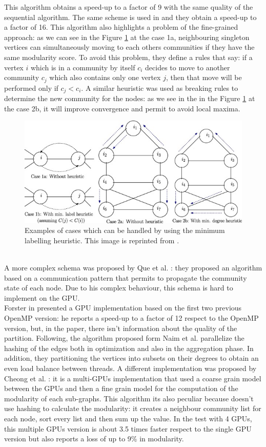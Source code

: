 This algorithm obtains a speed-up to a factor of 9 with the same quality of the sequential algorithm. The same scheme is used in \cite{lu2015parallel} and they obtain a speed-up to a factor of 16.
This algorithm also highlights a problem of the fine-grained approach: as we can see in the Figure \ref{fig:swap} at the case 1a, neighbouring singleton vertices can simultaneously moving to each others communities if they have the same modularity score. To avoid this problem, they define a rules that say: if a vertex $i$ which is in a community by itself $c_i$ decides to move to another community $c_j$  which also contains only one vertex $j$, then that move will be performed only if $c_j < c_i$. A similar heuristic was used as breaking rules to determine the new community for the nodes: as we see in the in the Figure \ref{fig:swap} at the case 2b, it will improve convergence and permit to avoid local maxima.
\begin{figure}
	\centering
	\includegraphics[width=1\linewidth]{0-resources/swap.jpg}
	\caption{ Examples of cases which can be handled by using the minimum labelling heuristic. This image is reprinted from \cite{lu2015parallel}.}
	\label{fig:swap}
\end{figure}\\
A more complex schema was proposed by Que et al. \cite{que2015scalable}: they proposed an algorithm based on a communication pattern that permits to propagate the community state of each node. 
Due to his complex behaviour, this schema is hard to implement on the GPU. \\
Forster in \cite{forster2016louvain} presented a GPU implementation based on the first two previous OpenMP version: he reports a speed-up to a factor of 12 respect to the OpenMP version, but, in the paper, there isn't information about the quality of the partition. Following, the algorithm proposed form Naim et al. \cite{naim2017community} parallelize the hashing of the edges both in optimization and also in the aggregation phase. In addition, they partitioning the vertices into subsets on their degrees to obtain an even load balance between threads.
A different implementation was proposed by Cheong et al. \cite{cheong2013hierarchical}: it is a multi-GPUs implementation that used a coarse grain model between the GPUs and then a fine grain model for the computation of the modularity of each sub-graphs. This algorithm its also peculiar because doesn't use hashing to calculate the modularity: it creates a neighbour community list for each node, sort every list and then sum up the value. In the test with 4 GPUs, this multiple GPUs version is about 3.5 times faster respect to the single GPU version but also reports a loss of up to 9\% in modularity.